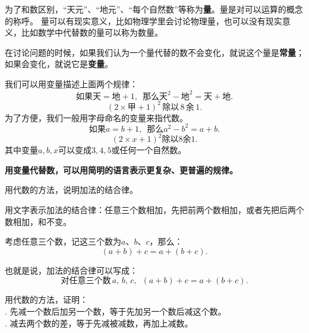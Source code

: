\documentclass[12pt,UTF8,fontset=none]{ctexbook}
\begin{document}
为了和数区别，“天元”、“地元”、“每个自然数”等称为\textbf{量}。量是对可以运算的概念的称呼。
量可以有现实意义，比如物理学里会讨论物理量，也可以没有现实意义，比如数学中代替数的量可以称为数量。

在讨论问题的时候，如果我们认为一个量代替的数不会变化，就说这个量是\textbf{常量}；如果会变化，就说它是\textbf{变量}。

我们可以用变量描述上面两个规律：
$$ \mbox{如果天} = \mbox{地}+1, \,\,\,\mbox{那么}\mbox{天}^2 - \mbox{地}^2 = \mbox{天} + \mbox{地}. $$
$$  (2\times \mbox{甲} + 1)^2 \,\mbox{除以} \,8\,\mbox{余}\,1.$$
为了方便，我们一般用字母命名的变量来指代数。
$$ \mbox{如果} a = b+1, \,\,\,\mbox{那么} a^2 - b^2 = a + b. $$
$$  (2\times x + 1)^2 \mbox{除以} 8\mbox{余} 1.$$
其中变量$a,b,x$可以变成$3,4,5$或任何一个自然数。

\textbf{用变量代替数，可以用简明的语言表示更复杂、更普遍的规律。}

\begin{et}
    用代数的方法，说明加法的结合律。
\end{et}

\begin{so}
    用文字表示加法的结合律：任意三个数相加，先把前两个数相加，或者先把后两个数相加，和不变。

    考虑任意三个数，记这三个数为$a$、$b$、$c$，那么：
    $$ (a + b) + c = a + (b + c).$$

    也就是说，加法的结合律可以写成：
    $$ \mbox{对任意三个数}\,a,\,b,\,c, \,\,\, (a + b) + c = a + (b + c).$$

\end{so}

\begin{et}
    用代数的方法，证明：\\
    . 先减一个数后加另一个数，等于先加另一个数后减这个数。\\
    . 减去两个数的差，等于先减被减数，再加上减数。\\
\end{et}
\end{document}
